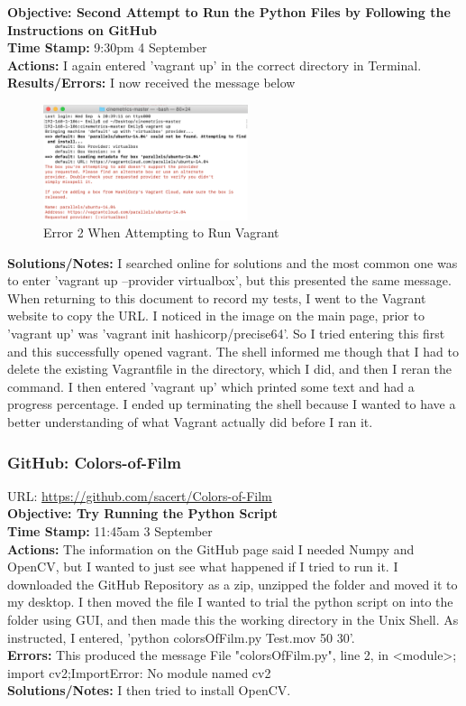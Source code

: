\documentclass{article}
\begin{document}
\textbf{Objective: Second Attempt to Run the Python Files by Following the Instructions on GitHub}\\
\textbf{Time Stamp:} 9:30pm 4 September\\
\textbf{Actions:} I again entered 'vagrant up' in the correct directory in Terminal.\\
\textbf{Results/Errors:} I now received the message below
\begin{figure}[htp]
    \centering
    \includegraphics[width=6cm]{Vagrant_Image_2.png}
    \caption{Error 2 When Attempting to Run Vagrant}
\end{figure}
\textbf{Solutions/Notes:} I searched online for solutions and the most common one was to enter 'vagrant up --provider virtualbox', but this presented the same message. When returning to this document to record my tests, I went to the Vagrant website to copy the URL. I noticed in the image on the main page, prior to 'vagrant up' was 'vagrant init hashicorp/precise64'. So I tried entering this first and this successfully opened vagrant. The shell informed me though that I had to delete the existing Vagrantfile in the directory, which I did, and then I reran the command. I then entered 'vagrant up' which printed some text and had a progress percentage. I ended up terminating the shell because I wanted to have a better understanding of what Vagrant actually did before I ran it.\\

\subsubsection{GitHub: Colors-of-Film}
URL: \url{https://github.com/sacert/Colors-of-Film}\\

\textbf{Objective: Try Running the Python Script}\\
\textbf{Time Stamp:} 11:45am 3 September\\
\textbf{Actions:} The information on the GitHub page said I needed Numpy and OpenCV, but I wanted to just see what happened if I tried to run it. I downloaded the GitHub Repository as a zip, unzipped the folder and moved it to my desktop. I then moved the file I wanted to trial the python script on into the folder using GUI, and then made this the working directory in the Unix Shell. As instructed, I entered, 'python colorsOfFilm.py Test.mov 50 30'.\\
\textbf{Errors:} This produced the message File "colorsOfFilm.py", line 2, in <module>; import cv2;ImportError: No module named cv2\\
\textbf{Solutions/Notes:} I then tried to install OpenCV.\\
\end{document}
